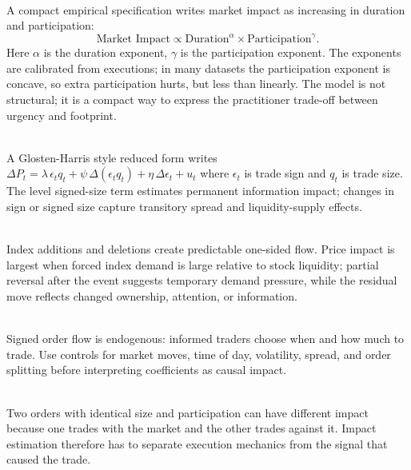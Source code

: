 \documentclass[a4paper,oneside,openany]{book}
\begin{document}
\begin{model} \\
A compact empirical specification writes market impact as increasing in duration and participation:
\begin{equation*}
\text{Market Impact} \propto \text{Duration}^{\alpha}\times \text{Participation}^{\gamma}.
\end{equation*}
Here $\alpha$ is the duration exponent, $\gamma$ is the participation exponent. The exponents are calibrated from executions; in many datasets the participation exponent is concave, so extra participation hurts, but less than linearly. The model is not structural; it is a compact way to express the practitioner trade-off between urgency and footprint.
\end{model}

\begin{model} \\
A Glosten-Harris style reduced form writes $\Delta P_t=\lambda\,\epsilon_t q_t+\psi\,\Delta(\epsilon_t q_t)+\eta\,\Delta\epsilon_t+u_t$ where $\epsilon_t$ is trade sign and $q_t$ is trade size. The level signed-size term estimates permanent information impact; changes in sign or signed size capture transitory spread and liquidity-supply effects.
\end{model}

\begin{empiricalfinding} \\
Index additions and deletions create predictable one-sided flow. Price impact is largest when forced index demand is large relative to stock liquidity; partial reversal after the event suggests temporary demand pressure, while the residual move reflects changed ownership, attention, or information.
\end{empiricalfinding}

\begin{caveat} \\
Signed order flow is endogenous: informed traders choose when and how much to trade. Use controls for market moves, time of day, volatility, spread, and order splitting before interpreting coefficients as causal impact.
\end{caveat}

\begin{caveat} \\
Two orders with identical size and participation can have different impact because one trades with the market and the other trades against it. Impact estimation therefore has to separate execution mechanics from the signal that caused the trade.
\end{caveat}
\end{document}
